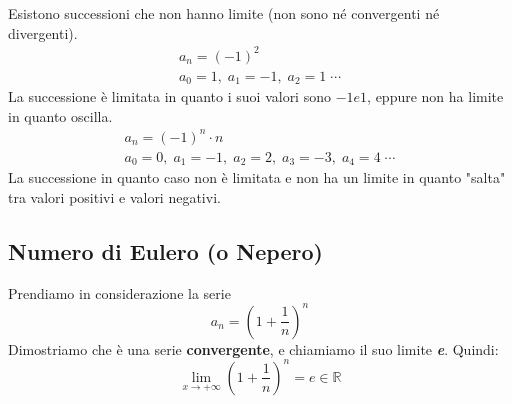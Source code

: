 

Esistono successioni che non hanno limite (non sono né convergenti né divergenti).
\begin{gather*}
    a_n = (-1)^2\\
    a_0 = 1,\; a_1 = -1,\; a_2 = 1 \;\cdots
\end{gather*}
La successione è limitata in quanto i suoi valori sono $-1 e 1$, eppure non ha limite in quanto oscilla.
\begin{gather*}
    a_n = (-1)^n \cdot n\\
    a_0 = 0,\; a_1 = -1,\; a_2 = 2,\; a_3 = -3,\; a_4 = 4 \;\cdots
\end{gather*}
La successione in quanto caso non è limitata e non ha un limite in quanto "salta" tra valori positivi e valori negativi.

\subsection{Numero di Eulero (o Nepero)} \label{sec_numeroDiEulero}
Prendiamo in considerazione la serie
\begin{equation*}
    a_n = \left(1+\dfrac{1}{n} \right)^n
\end{equation*}
Dimostriamo che è una serie \textbf{convergente}, e chiamiamo il suo limite \textbf{\textit{e}}. Quindi:
\begin{equation*}
    \lim_{x\to +\infty} \left(1+\dfrac{1}{n}\right)^n = e \in \mathbb{R}
\end{equation*}

